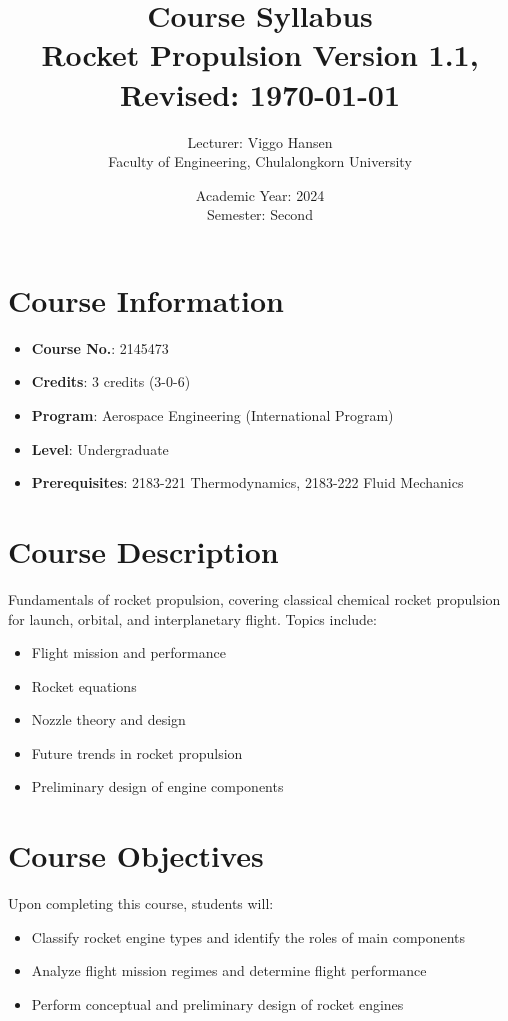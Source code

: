 \documentclass[12pt]{article}
\title{\textbf{Course Syllabus \\ Rocket Propulsion} \newline \small{Version 1.1, Revised: \today}}
\author{Lecturer: Viggo Hansen\\
Faculty of Engineering, Chulalongkorn University}
\date{Academic Year: 2024 \\ Semester: Second}
\begin{document}
\maketitle

\tableofcontents

\section*{Course Information}
\label{sec:course_info}
\begin{itemize}
    \item \textbf{Course No.}: 2145473
    \item \textbf{Credits}: 3 credits (3-0-6)
    \item \textbf{Program}: Aerospace Engineering (International Program)
    \item \textbf{Level}: Undergraduate
    \item \textbf{Prerequisites}: 2183-221 Thermodynamics, 2183-222 Fluid Mechanics
\end{itemize}

\section*{Course Description}
Fundamentals of rocket propulsion, covering classical chemical rocket propulsion for launch, orbital, and interplanetary flight. Topics include:
\begin{itemize}
    \item Flight mission and performance
    \item Rocket equations
    \item Nozzle theory and design
    \item Future trends in rocket propulsion
    \item Preliminary design of engine components
\end{itemize}

\section*{Course Objectives}
Upon completing this course, students will:
\begin{itemize}
    \item Classify rocket engine types and identify the roles of main components
    \item Analyze flight mission regimes and determine flight performance
    \item Perform conceptual and preliminary design of rocket engines
\end{itemize}
\end{document}
